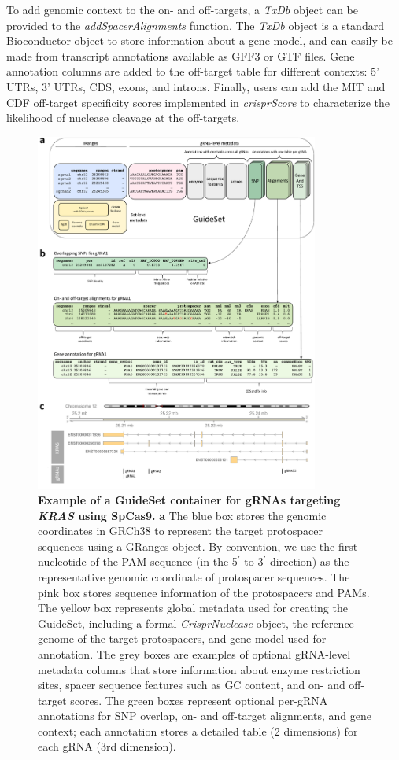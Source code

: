 \documentclass[pdftex,english,10pt]{article}
\begin{document}
To add genomic context to the on- and off-targets, a \textit{TxDb} object can be provided to the \textit{addSpacerAlignments} function. 
The \textit{TxDb} object is a standard Bioconductor object to store information about a gene model, and can easily be made from transcript annotations available as GFF3 or GTF files. Gene annotation columns are added to the off-target table for different contexts: 5' UTRs, 3' UTRs, CDS, exons, and introns. Finally, users can add the MIT and CDF off-target specificity scores \citep{mit, azimuth} implemented in \textit{crisprScore} to characterize the likelihood of nuclease cleavage at the off-targets. 


\begin{figure}
\centering
\includegraphics[width=0.83\textwidth]{figures/guideset/guideset.pdf}
  \caption{\textbf{Example of a GuideSet container for gRNAs targeting \textit{KRAS} using SpCas9.} 
 \textbf{a} The blue box stores the genomic coordinates in GRCh38 to represent the target protospacer sequences using a GRanges object. 
By convention, we use the first nucleotide of the PAM sequence (in the 5$^{\prime}$ to 3$^{\prime}$ direction) as the representative genomic coordinate of protospacer sequences. The pink box stores sequence information of the protospacers and PAMs. The yellow box represents global metadata used for creating the GuideSet, including a formal \textit{CrisprNuclease} object, the reference genome of the target protospacers, and gene model used for annotation. The grey boxes are examples of optional gRNA-level metadata columns that store information about enzyme restriction sites, spacer sequence features such as GC content, and on- and off-target scores. The green boxes represent optional per-gRNA annotations for SNP overlap, on- and off-target alignments, and gene context; each annotation stores a detailed table (2 dimensions) for each gRNA (3rd dimension). 
}
\end{figure}
\end{document}
